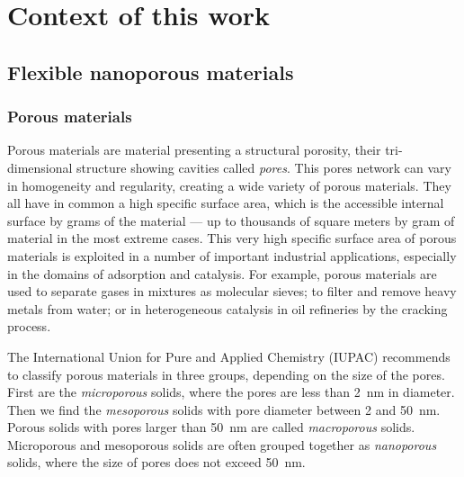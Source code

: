 \documentclass[thesis]{subfiles}
\begin{document}
\chapter{Context of this work}

\section{Flexible nanoporous materials}

\subsection{Porous materials}

Porous materials are material presenting a structural porosity, their
tri-dimensional structure showing cavities called \emph{pores}. This pores
network can vary in homogeneity and regularity, creating a wide variety of
porous materials. They all have in common a high specific surface area, which is
the accessible internal surface by grams of the material --- up to thousands of
square meters by gram of material\cite{Farha2012} in the most extreme cases.
This very high specific surface area of porous materials is exploited in a
number of important industrial applications, especially in the domains of
adsorption and catalysis. For example, porous materials are used to separate
gases in mixtures as molecular sieves; to filter and remove heavy metals from
water; or in heterogeneous catalysis in oil refineries by the cracking process.

The International Union for Pure and Applied Chemistry (IUPAC) recommends to
classify porous materials in three groups, depending on the size of the
pores\cite{Rouquerol1994}. First are the \emph{microporous} solids, where the
pores are less than \SI{2}{nm} in diameter. Then we find the \emph{mesoporous}
solids with pore diameter between 2 and \SI{50}{nm}. Porous solids with pores
larger than \SI{50}{nm} are called \emph{macroporous} solids. Microporous and
mesoporous solids are often grouped together as \emph{nanoporous} solids, where
the size of pores does not exceed \SI{50}{nm}.
\end{document}

